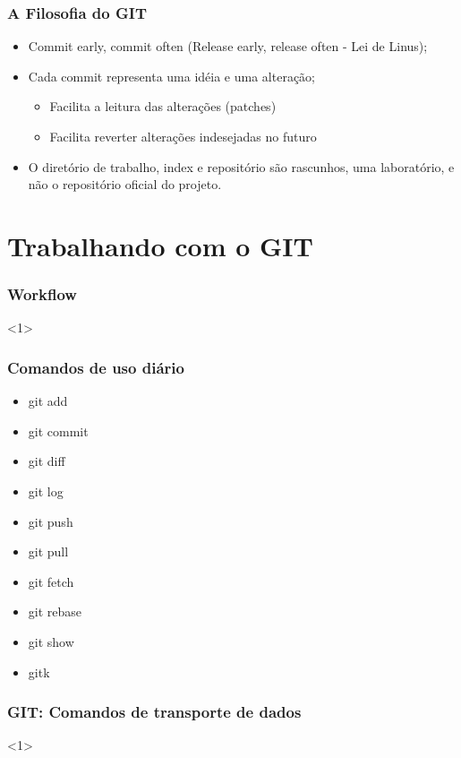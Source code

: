 \documentclass{beamer}
\begin{document}
\begin{frame}
\frametitle{A Filosofia do GIT}
\begin{itemize}
\item Commit early, commit often (Release early, release often - Lei de Linus);
\item Cada commit representa uma idéia e uma alteração;
\begin{itemize}
\item Facilita a leitura das alterações (patches)
\item Facilita reverter alterações indesejadas no futuro
\end{itemize}
\item O diretório de trabalho, index e repositório são rascunhos, uma laboratório, e não o repositório oficial do projeto.
\end{itemize}
\end{frame}

\section{Trabalhando com o GIT}
\begin{frame}
\frametitle{Workflow}

<1>

\end{frame}

\begin{frame}
\frametitle{Comandos de uso diário}


\begin{itemize}
\item git add
\item git commit
\item git diff
\item git log
\item git push
\item git pull
\item git fetch
\item git rebase
\item git show
\item gitk
\end{itemize}


\end{frame}

\begin{frame}
\frametitle{GIT: Comandos de transporte de dados}

<1>

\end{frame}
\end{document}
